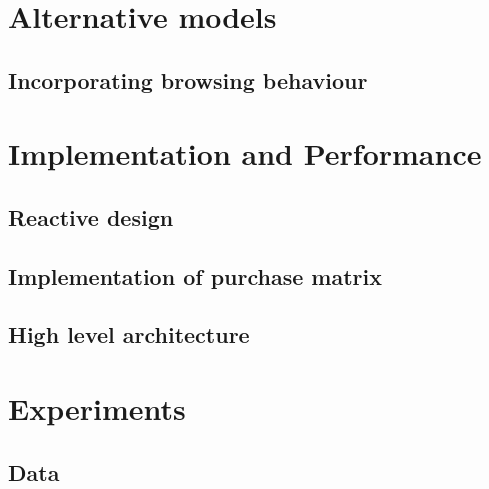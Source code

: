 \documentclass[10pt]{reportMaster}
\begin{document}
\chapter{Alternative models}

\section{Incorporating browsing behaviour}






\chapter{Implementation and Performance}

\section{Reactive design}

\section{Implementation of purchase matrix}

\section{High level architecture}








\chapter{Experiments}

\section{Data}
\end{document}
